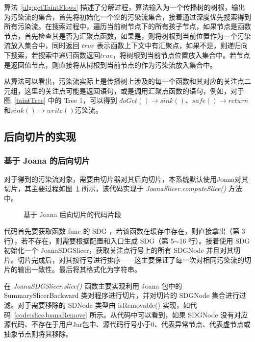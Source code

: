 算法~\ref{alg:getTaintFlows} 描述了分解过程，算法输入为一个传播树的树根，输出为污染流的集合，首先将初始化一个空的污染流集合，接着通过深度优先搜索得到所有污染流。在搜索过程中，遍历当前树节点下的所有孩子节点，如果节点是函数节点，首先检查其是否为汇聚点函数，如果是，则将树根到当前位置作为一个污染流放入集合中，同时返回 $true$ 表示函数上下文中有汇聚点，如果不是，则递归向下搜索，若搜索中递归函数返回$true$，将树根到当前节点位置放入集合中。若节点是返回值节点，则直接将从树根到当前节点的作为污染流放入集合中。

从算法可以看出，污染流实际上是传播树上涉及的每一个函数和其对应的关注点二元组，这里的关注点可能是返回语句，或是调用汇聚点函数的语句，例如，对于图~\ref{taintTree} 中的 Tree 1，可以得到 $doGet() \rightarrow sink()$、$safe() \rightarrow return$和$sink() \rightarrow write()$污染流。

\subsection{后向切片的实现}
\subsubsection{基于 Joana 的后向切片}
对于得到的污染流对象，需要由切片器对其后向切片，本系统默认使用Joana对其切片，其主要过程如图~\ref{code:sliceJoana} 所示，该代码实现于 \textit{JoanaSlicer.computeSlice()} 方法中。

\begin{figure}[!htbp]
    \centering
    \begin{minipage}{0.9\textwidth}
        
    \end{minipage}
\caption{基于 Joana 后向切片的代码片段}\label{code:sliceJoana}
\end{figure}

代码首先要获取函数 func 的 SDG ，若该函数在缓存中存在，则直接拿出（第 3 行），若不存在，则需要根据配置和入口生成 SDG（第 5$\sim$16 行）。接着使用 SDG 初始化一个 JoanaSDGSlicer，获取关注点行号上的所有 SDGNode 并且对其切片。切片完成后，对其按行号进行排序——这主要保证了每一次对相同污染流的切片的输出一致性。最后将其格式化为字符串。

在 \textit{JoanaSDGSlicer.slice()} 函数主要实现利用 Joana 包中的 SummarySlicerBackward 类对程序进行切片，并对切片的 SDGNode 集合进行过滤。对于需要移除的 SDNode 类型由 isRemovable() 实现，如代码~\ref{code:sliceJoanaRemove} 所示。从代码中可以看到，如果 SDGNode 没有对应源代码、不存在于用户Jar包中、源代码行号小于0、代表异常节点、代表虚节点或抽象节点则将其移除。

